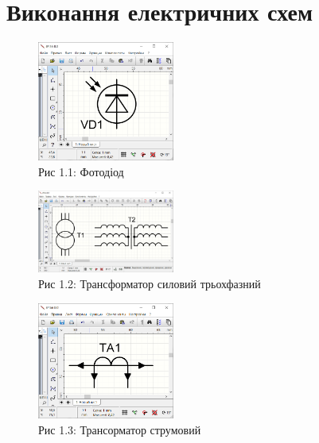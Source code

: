 \documentclass[a4paper]{article}
\begin{document}
    \newpage 
    \section*{Виконання електричних схем}

    \begin{figure}[h]
        \centering
        \includegraphics[width=0.4\textwidth]{imgs/LW1_1.png}
        \caption*{Рис 1.1: Фотодіод}
    \end{figure} 

    \begin{figure}[h]
        \centering
        \includegraphics[width=0.4\textwidth]{imgs/LW1_2.png}
        \caption*{Рис 1.2: Трансформатор силовий трьохфазний }
    \end{figure} 

    \begin{figure}[h]
        \centering
        \includegraphics[width=0.4\textwidth]{imgs/LW1_3.png}
        \caption*{Рис 1.3: Трансорматор струмовий}
    \end{figure} 

    
\end{document}
